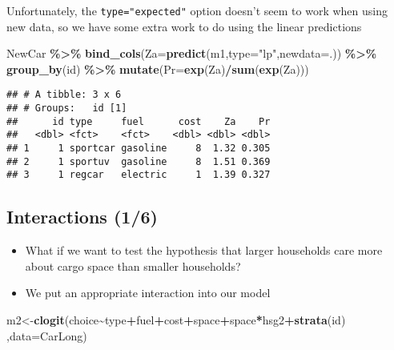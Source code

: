 \documentclass[
  11pt,
]{article}
\newenvironment{Shaded}{\begin{snugshade}}{\end{snugshade}}
\newcommand{\AttributeTok}[1]{\textcolor[rgb]{0.13,0.29,0.53}{#1}}
\newcommand{\FunctionTok}[1]{\textcolor[rgb]{0.13,0.29,0.53}{\textbf{#1}}}
\newcommand{\NormalTok}[1]{#1}
\newcommand{\OtherTok}[1]{\textcolor[rgb]{0.56,0.35,0.01}{#1}}
\newcommand{\SpecialCharTok}[1]{\textcolor[rgb]{0.81,0.36,0.00}{\textbf{#1}}}
\newcommand{\StringTok}[1]{\textcolor[rgb]{0.31,0.60,0.02}{#1}}
\begin{document}
Unfortunately, the \texttt{type="expected"} option doesn't seem to work
when using new data, so we have some extra work to do using the linear
predictions

\footnotesize

\begin{Shaded}
\begin{Highlighting}[]
\NormalTok{NewCar }\SpecialCharTok{\%\textgreater{}\%} \FunctionTok{bind\_cols}\NormalTok{(}\AttributeTok{Za=}\FunctionTok{predict}\NormalTok{(m1,}\AttributeTok{type=}\StringTok{"lp"}\NormalTok{,}\AttributeTok{newdata=}\NormalTok{.)) }\SpecialCharTok{\%\textgreater{}\%} 
  \FunctionTok{group\_by}\NormalTok{(id) }\SpecialCharTok{\%\textgreater{}\%} 
  \FunctionTok{mutate}\NormalTok{(}\AttributeTok{Pr=}\FunctionTok{exp}\NormalTok{(Za)}\SpecialCharTok{/}\FunctionTok{sum}\NormalTok{(}\FunctionTok{exp}\NormalTok{(Za)))}
\end{Highlighting}
\end{Shaded}

\begin{verbatim}
## # A tibble: 3 x 6
## # Groups:   id [1]
##      id type     fuel      cost    Za    Pr
##   <dbl> <fct>    <fct>    <dbl> <dbl> <dbl>
## 1     1 sportcar gasoline     8  1.32 0.305
## 2     1 sportuv  gasoline     8  1.51 0.369
## 3     1 regcar   electric     1  1.39 0.327
\end{verbatim}

\normalsize

\hypertarget{interactions-16}{%
\subsection{Interactions (1/6)}\label{interactions-16}}

\begin{itemize}
\item
  What if we want to test the hypothesis that larger households care
  more about cargo space than smaller households?
\item
  We put an appropriate interaction into our model
\end{itemize}

\footnotesize

\begin{Shaded}
\begin{Highlighting}[]
\NormalTok{m2}\OtherTok{\textless{}{-}}\FunctionTok{clogit}\NormalTok{(choice}\SpecialCharTok{\textasciitilde{}}\NormalTok{type}\SpecialCharTok{+}\NormalTok{fuel}\SpecialCharTok{+}\NormalTok{cost}\SpecialCharTok{+}\NormalTok{space}\SpecialCharTok{+}\NormalTok{space}\SpecialCharTok{*}\NormalTok{hsg2}\SpecialCharTok{+}\FunctionTok{strata}\NormalTok{(id)}
\NormalTok{           ,}\AttributeTok{data=}\NormalTok{CarLong)}
\end{Highlighting}
\end{Shaded}
\end{document}
